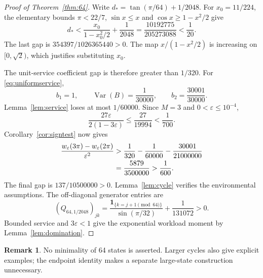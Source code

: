 \documentclass[11pt,reqno]{amsart}
\numberwithin{equation}{section}
\theoremstyle{plain}
\theoremstyle{definition}
\newtheorem{remark}[theorem]{Remark}
\newcommand{\1}{\mathbf 1}
\newcommand{\eps}{\varepsilon}
\DeclareMathOperator{\Var}{Var}
\begin{document}
\begin{proof}[Proof of Theorem~\ref{thm:64}]
Write $d_* = \tan(\pi/64)+1/2048$. For $x_0=11/224$, the elementary bounds $\pi<22/7$, $\sin x\le x$ and $\cos x\ge1-x^2/2$ give
\begin{equation}\label{eq:64damping}
 d_*<\frac{x_0}{1-x_0^2/2}+\frac1{2048}
 =\frac{10192775}{205273088}<\frac1{20}.
\end{equation}
The last gap is $354397/1026365440>0$. The map $x/(1-x^2/2)$ is increasing on $[0,\sqrt2)$, which justifies substituting $x_0$.

The unit-service coefficient gap is therefore greater than $1/320$. For \eqref{eq:uniformservice},
\begin{equation}\label{eq:uniformmoments}
 b_1=1,\qquad \Var(B)=\frac1{30000},\qquad b_2=\frac{30001}{30000}.
\end{equation}
Lemma~\ref{lem:service} loses at most $1/60000$. Since $M=3$ and $0<\eps\le10^{-4}$,
\[
 \frac{27\eps}{2(1-3\eps)}\le\frac{27}{19994}<\frac1{700}.
\]
Corollary~\ref{cor:signtest} now gives
\begin{align}\label{eq:64fullmargin}
 \frac{w_\eps(3\pi)-w_\eps(2\pi)}{\eps^2}
 &>\frac1{320}-\frac1{60000}-\frac{30001}{21000000}\notag\\
 &=\frac{5879}{3500000}>\frac1{600}.
\end{align}
The final gap is $137/10500000>0$. Lemma~\ref{lem:cycle} verifies the environmental assumptions. The off-diagonal generator entries are
\[
 (Q_{64,1/2048})_{jk}
 =\frac{\1_{\{k=j+1\pmod{64}\}}}{\sin(\pi/32)}+\frac1{131072}>0.
\]
Bounded service and $3\eps<1$ give the exponential workload moment by Lemma~\ref{lem:domination}.
\end{proof}
\begin{remark}
No minimality of 64 states is asserted. Larger cycles also give explicit examples; the endpoint identity makes a separate large-state construction unnecessary.
\end{remark}
\end{document}
